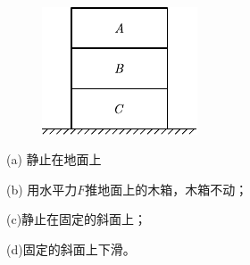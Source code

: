 \begin{questions}
\begin{figurex}
    \centering
     \hspace{4em}
    \setcounter{subfigure}{2}
    \\[1em]
    \setcounter{subfigure}{1}
     \hspace{4em}
    \setcounter{subfigure}{3}
    \caption{}
    \label{fig:03.18}
\end{figurex}

\begin{figure}
    \centering
    \includegraphics{figure/fig03.19}
    \caption{}
    \label{fig:03.19}
\end{figure}
(a) 静止在地面上

(b) 用水平力$ F $推地面上的木箱，木箱不动；

(c)静止在固定的斜面上；

(d)固定的斜面上下滑。


\end{questions}

